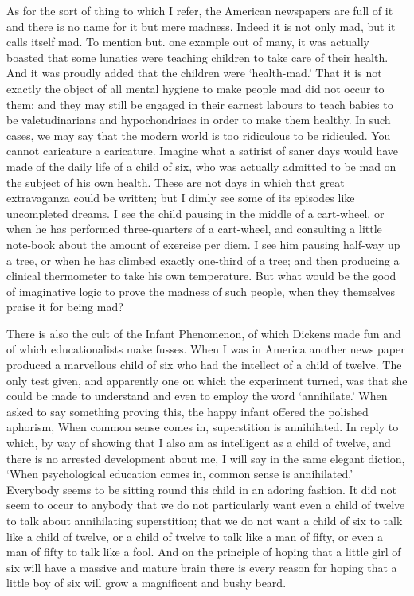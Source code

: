 \documentclass{book}
\begin{document}
As for the sort of thing to which I refer, the American newspapers are full of it and there is no name for it but mere madness. Indeed it is not only mad, but it calls itself mad. To mention but. one example out of many, it was actually boasted that some lunatics were teaching children to take care of their health. And it was proudly added that the children were ‘health-mad.’ That it is not exactly the object of all mental hygiene to make people mad did not occur to them; and they may still be engaged in their earnest labours to teach babies to be valetudinarians and hypochondriacs in order to make them healthy. In such cases, we may say that the modern world is too ridiculous to be ridiculed. You cannot caricature a caricature. Imagine what a satirist of saner days would have made of the daily life of a child of six, who was actually admitted to be mad on the subject of his own health. These are not days in which that great extravaganza could be written; but I dimly see some of its episodes like uncompleted dreams. I see the child pausing in the middle of a cart-wheel, or when he has performed three-quarters of a cart-wheel, and consulting a little note-book about the amount of exercise per diem. I see him pausing half-way up a tree, or when he has climbed exactly one-third of a tree; and then producing a clinical thermometer to take his own temperature. But what would be the good of imaginative logic to prove the madness of such people, when they themselves praise it for being mad?

There is also the cult of the Infant Phenomenon, of which Dickens made fun and of which educationalists make fusses. When I was in America another news paper produced a marvellous child of six who had the intellect of a child of twelve. The only test given, and apparently one on which the experiment turned, was that she could be made to understand and even to employ the word ‘annihilate.’ When asked to say something proving this, the happy infant offered the polished aphorism, When common sense comes in, superstition is annihilated. In reply to which, by way of showing that I also am as intelligent as a child of twelve, and there is no arrested development about me, I will say in the same elegant diction, ‘When psychological education comes in, common sense is annihilated.’ Everybody seems to be sitting round this child in an adoring fashion. It did not seem to occur to anybody that we do not particularly want even a child of twelve to talk about annihilating superstition; that we do not want a child of six to talk like a child of twelve, or a child of twelve to talk like a man of fifty, or even a man of fifty to talk like a fool. And on the principle of hoping that a little girl of six will have a massive and mature brain there is every reason for hoping that a little boy of six will grow a magnificent and bushy beard.
\end{document}
